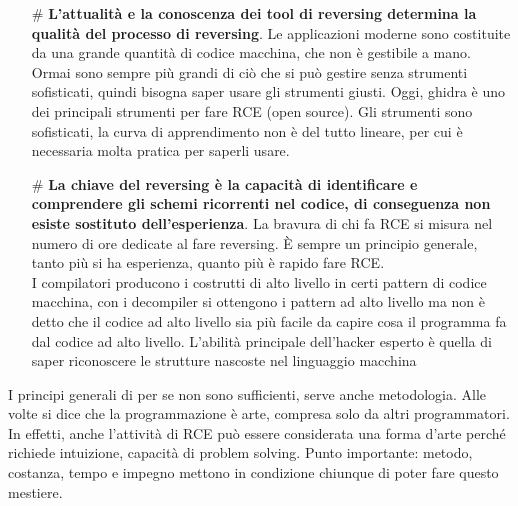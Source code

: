 \documentclass[12pt, oneside]{extbook}
\begin{document}
\begin{itemize}
\item[\#] \textbf{L'attualità e la conoscenza dei tool di reversing determina la qualità del processo di reversing}. Le applicazioni moderne sono costituite da una grande quantità di codice macchina, che non è gestibile a mano. Ormai sono sempre più grandi di ciò che si può gestire senza strumenti sofisticati, quindi bisogna saper usare gli strumenti giusti. Oggi, ghidra è uno dei principali strumenti per fare RCE (open source). Gli strumenti sono sofisticati, la curva di apprendimento non è del tutto lineare, per cui è necessaria molta pratica per saperli usare.
\item[\#] \textbf{La chiave del reversing è la capacità di identificare e comprendere gli schemi ricorrenti nel codice, di conseguenza non esiste sostituto dell'esperienza}. La bravura di chi fa RCE si misura nel numero di ore dedicate al fare reversing. È sempre un principio generale, tanto più si ha esperienza, quanto più è rapido fare RCE.\\ I compilatori producono i costrutti di alto livello in certi pattern di codice macchina, con i decompiler si ottengono i pattern ad alto livello ma non è detto che il codice ad alto livello sia più facile da capire cosa il programma fa dal codice ad alto livello. L'abilità principale dell'hacker esperto è quella di saper riconoscere le strutture nascoste nel linguaggio macchina
\end{itemize} 
I principi generali di per se non sono sufficienti, serve anche metodologia. Alle volte si dice che la programmazione è arte, compresa solo da altri programmatori. In effetti, anche l'attività di RCE può essere considerata una forma d'arte perché richiede intuizione, capacità di problem solving. Punto importante: metodo, costanza, tempo e impegno mettono in condizione chiunque di poter fare questo mestiere.
\end{document}
